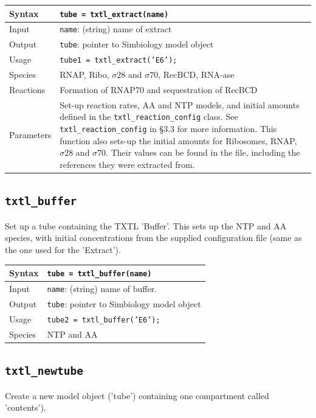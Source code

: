 \documentclass[english]{report}
\begin{document}
			\begin{tabular}{p{2cm}|p{13cm}}
			Syntax & \texttt{tube = txtl\_extract(name)}\\ \hline
			Input & \texttt{name}: (string) name of extract \\ \hline
			Output & \texttt{tube}: pointer to Simbiology model object\\ \hline
			Usage & \texttt{tube1 = txtl\_extract('E6');}\\ \hline
			Species & RNAP, Ribo, $\sigma 28$ and $\sigma 70$, RecBCD, RNA-ase \\ \hline
			Reactions & Formation of RNAP70 and sequestration of RecBCD \\ \hline
			Parameters & Set-up reaction rates, AA and NTP models, and initial amounts defined in the \texttt{txtl\_reaction\_config} class. See \texttt{txtl\_reaction\_config} in \S 3.3 for more information. This function also sets-up the initial amounts for Ribosomes, RNAP,  $\sigma 28$ and $\sigma 70$. Their values can be found in the file, including the references they were extracted from. \\
			\end{tabular}
			
		\subsection*{\texttt{txtl\_buffer}}
		Set up a tube containing the TXTL 'Buffer'. This sets up the NTP and AA species, with initial concentrations from the supplied configuration file (same as the one used for the 'Extract'). \\
					
			\begin{tabular}{p{2cm}|p{13cm}}
			Syntax & \texttt{tube = txtl\_buffer(name)}\\ \hline
			Input & \texttt{name}: (string) name of buffer. \\ \hline
			Output & \texttt{tube}: pointer to Simbiology model object\\ \hline
			Usage & \texttt{tube2 = txtl\_buffer('E6');}\\ \hline
			Species & NTP and AA \\
			\end{tabular}

		\subsection*{\texttt{txtl\_newtube}}	
		Create a new model object ('tube') containing one compartment called 'contents'). \\	
			
\end{document}

